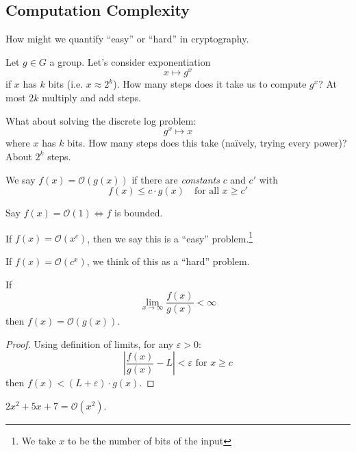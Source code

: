 \subsection{Computation Complexity}
How might we quantify ``easy'' or ``hard'' in cryptography.
\begin{example}
    Let $g\in G$ a group. Let's consider exponentiation
    \[x\longmapsto g^x\]
    if $x$ has $k$ bits (i.e. $x\approx 2^k$). How many steps does it take us to compute $g^x$? At most $2k$ multiply and add steps.

    What about solving the discrete log problem:
    \[g^x\longmapsto x\]
    where $x$ has $k$ bits. How many steps does this take (na\"ively, trying every power)? About $2^k$ steps.
\end{example}
\begin{definition}[Big-O]
    We say $f(x) = \mathcal{O}(g(x))$ if there are \emph{constants} $c$ and $c'$ with
    \[f(x) \leq c\cdot g(x) \quad \text{for all }x\geq c'\]
\end{definition}
\begin{example}
    Say $f(x) = \mathcal{O}(1) \Leftrightarrow f$ is bounded.
\end{example}

If $f(x) = \mathcal{O}(x^c)$, then we say this is a ``easy'' problem.\footnote{We take $x$ to be the number of bits of the input}

If $f(x) = \mathcal{O}(c^x)$, we think of this as a ``hard'' problem.

\begin{proposition}
    If
    \[\lim_{x\to \infty}\frac{f(x)}{g(x)} < \infty\]
    then $f(x) = \mathcal{O}(g(x))$.
\end{proposition}
\begin{proof}
    Using definition of limits, for any $\varepsilon > 0$:
    \[\left\vert\frac{f(x)}{g(x)} - L\right\vert < \varepsilon \text{ for }x\geq c\]
    then $f(x) < (L + \varepsilon)\cdot g(x)$.
\end{proof}
\begin{example}
    $2x^2+5x+7 = \mathcal{O}(x^2)$.
\end{example}